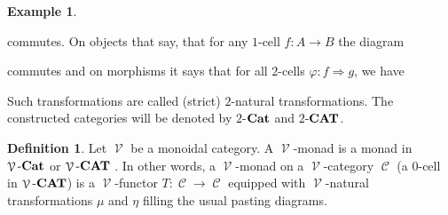 \documentclass[a4paper,11pt,oneside,openany]{scrbook}
\newcommand{\catname}[1]{{\normalfont\textbf{#1}}}
\newcommand{\Cat}{\catname{Cat}}
\newcommand{\CAT}{\catname{CAT}}
\newcommand{\from}{\colon}
\DeclareMathOperator{\K}{\mathcal{K}}
\DeclareMathOperator{\V}{\mathcal{V}}
\DeclareMathOperator{\C}{\mathcal{C}}
\theoremstyle{definition}
\theoremstyle{definition}
\newtheorem{defn}[thm]{Definition} %
\newtheorem{exmp}[thm]{Example}
\begin{document}
\begin{exmp}
\begin{center}
       \end{center}
    commutes. On objects that say, that for any $1$-cell $f \from A \to B$ the diagram 
       \begin{center}
       \end{center}
    commutes and on morphisms it says that for all $2$-cells $\varphi \from f \Rightarrow g$, we have 
       \begin{center}
       \end{center}
    Such transformations are called (strict) $2$-natural transformations. The constructed categories will be denoted by $2$-$\Cat$ and $2$-$\CAT$.
\end{exmp}

\begin{defn}
Let $\V$ be a monoidal category. A $\V$-monad is a monad in $\V\mbox{-}\Cat$ or $\V\mbox{-}\CAT$%
. In other words, a $\V$-monad on a $\V$-category $\C$ (a $0$-cell in $\V\mbox{-}\CAT$) is a $\V$-functor $T\colon\C\to\C$ equipped with $\V$-natural transformations $\mu$ and $\eta$ filling the usual pasting diagrams.
\end{defn}    
\end{document}
